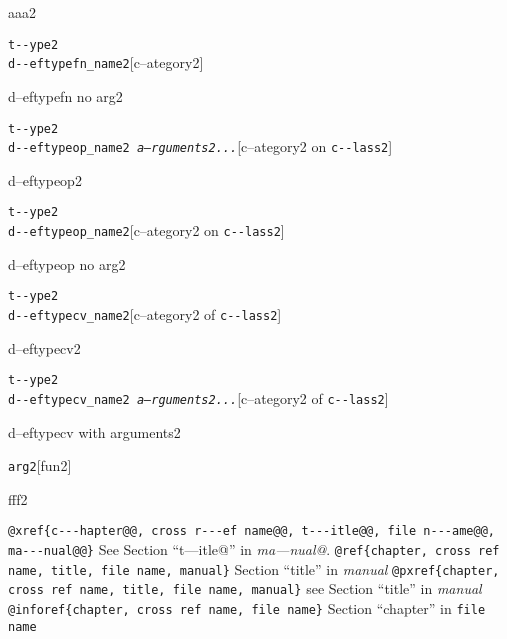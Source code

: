 \documentclass{book}
\begin{document}
%
aaa2

\noindent\texttt{t{-}{-}ype2\leavevmode{}\\d{-}{-}eftypefn\_name2}\hfill[c--ategory2]



%
d--eftypefn no arg2

\noindent\texttt{t{-}{-}ype2\leavevmode{}\\d{-}{-}eftypeop\_name2 \bgroup{}\normalfont{}\textsl{a--rguments2...}\egroup{}}\hfill[c--ategory2 on \texttt{c{-}{-}lass2}]



%
d--eftypeop2

\noindent\texttt{t{-}{-}ype2\leavevmode{}\\d{-}{-}eftypeop\_name2}\hfill[c--ategory2 on \texttt{c{-}{-}lass2}]



%
d--eftypeop no arg2

\noindent\texttt{t{-}{-}ype2\leavevmode{}\\d{-}{-}eftypecv\_name2}\hfill[c--ategory2 of \texttt{c{-}{-}lass2}]



%
d--eftypecv2

\noindent\texttt{t{-}{-}ype2\leavevmode{}\\d{-}{-}eftypecv\_name2 \bgroup{}\normalfont{}\textsl{a--rguments2...}\egroup{}}\hfill[c--ategory2 of \texttt{c{-}{-}lass2}]



%
d--eftypecv with arguments2

\noindent\texttt{arg2}\hfill[fun2]



%
fff2


\texttt{@xref\{c{-}{-}{-}hapter@@, cross r{-}{-}{-}ef name@@, t{-}{-}{-}itle@@, file n{-}{-}{-}ame@@, ma{-}{-}{-}nual@@\}} See Section ``t---itle@'' in \textsl{ma---nual@}.
\texttt{@ref\{chapter, cross ref name, title, file name, manual\}} Section ``title'' in \textsl{manual}
\texttt{@pxref\{chapter, cross ref name, title, file name, manual\}} see Section ``title'' in \textsl{manual}
\texttt{@inforef\{chapter, cross ref name, file name\}} Section ``chapter'' in \texttt{file name}
\end{document}
